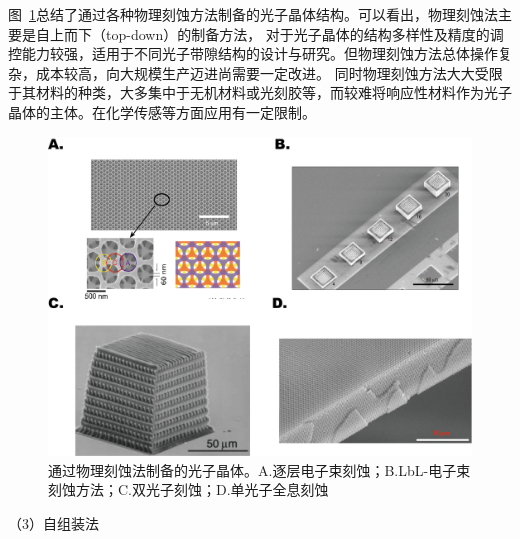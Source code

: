 图~\ref{fig:3DPhysPrepare}总结了通过各种物理刻蚀方法制备的光子晶体结构。可以看出，物理刻蚀法主要是自上而下（top-down）的制备方法，
对于光子晶体的结构多样性及精度的调控能力较强，适用于不同光子带隙结构的设计与研究。但物理刻蚀方法总体操作复杂，成本较高，向大规模生产迈进尚需要一定改进。
同时物理刻蚀方法大大受限于其材料的种类，大多集中于无机材料或光刻胶等，而较难将响应性材料作为光子晶体的主体。在化学传感等方面应用有一定限制。
\begin{figure}[htbp]
	\centering
	\includegraphics[width=0.8\linewidth]{figures/physPrepare.png}
	\caption{通过物理刻蚀法制备的光子晶体。A.逐层电子束刻蚀\cite{Qi2004ThreeDimensional}；B.LbL-电子束刻蚀方法\cite{Aoki2003Microassembly}；C.双光子刻蚀\cite{Cumpston1999TwoPhoton}；D.单光子全息刻蚀\cite{Campbell2000Fabrication}}
	\label{fig:3DPhysPrepare}
\end{figure}

（3）自组装法

